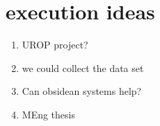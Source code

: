 \documentclass[11pt]{article}
\begin{document}
\section{execution ideas}

\begin{enumerate}
\item UROP project?
\item we could collect the data set
\item Can obsidean systems help?
\item MEng thesis
\end{enumerate}

\printbibliography
\end{document}
